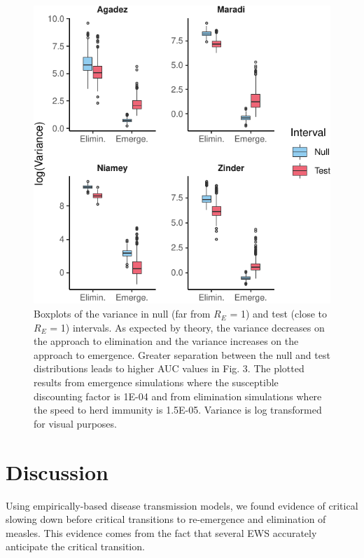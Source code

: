 \documentclass[3p]{elsarticle} %
\makeatletter
\def\maxwidth{\ifdim\Gin@nat@width>\linewidth\linewidth
\else\Gin@nat@width\fi}
\let\Oldincludegraphics\includegraphics
\renewcommand{\includegraphics}[1]{\Oldincludegraphics[width=\maxwidth]{#1}}
\makeatother
\begin{document}
\begin{figure}
\centering
\includegraphics{measles-ews-manuscript_files/figure-latex/var-ews-1.pdf}
\caption{Boxplots of the variance in null (far from \(R_E\) = 1) and
test (close to \(R_E\) = 1) intervals. As expected by theory, the
variance decreases on the approach to elimination and the variance
increases on the approach to emergence. Greater separation between the
null and test distributions leads to higher AUC values in Fig. 3. The
plotted results from emergence simulations where the susceptible
discounting factor is 1E-04 and from elimination simulations where the
speed to herd immunity is 1.5E-05. Variance is log transformed for
visual purposes. \label{var-ex}}
\end{figure}

\section{Discussion}\label{discussion}

Using empirically-based disease transmission models, we found evidence
of critical slowing down before critical transitions to re-emergence and
elimination of measles. This evidence comes from the fact that several
EWS accurately anticipate the critical transition.
\end{document}
